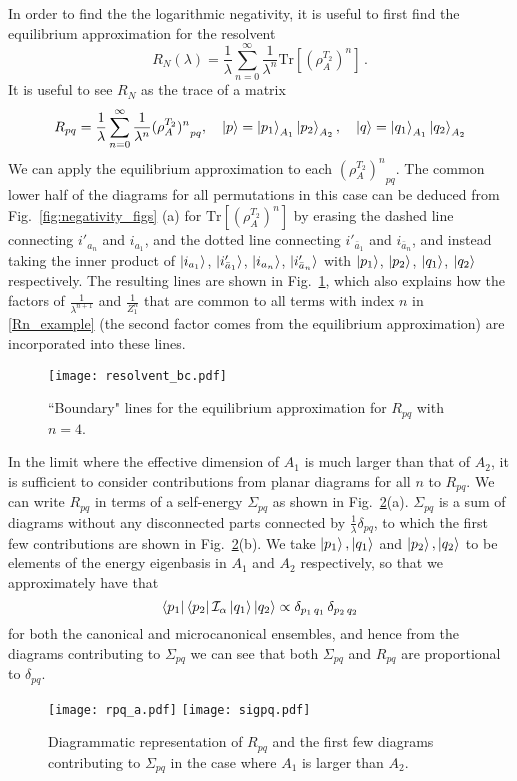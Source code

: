 \documentclass[a4paper,11pt]{article}
\newcommand{\be}{\begin{equation}}
\newcommand{\ee}{\end{equation}}
\newcommand\al{{\alpha}}
\newcommand\sI{{\ensuremath{{\mathcal I}}}}
\begin{document}
\begin{enumerate}
\begin{appendix}
In order to find the the logarithmic negativity, it is useful to first find the equilibrium approximation for the resolvent 
\be 
R_N(\lambda) = \frac{1}{\lambda}\sum_{n=0}^{\infty} \frac{1}{\lambda^n} \text{Tr}[(\rho_A^{T_2})^n]\, . \label{Rn_example}
\ee
It is useful to see $R_N$ as the trace of a matrix 
\be 
R_{pq} = \frac{1}{\lambda}\sum_{n=0}^{\infty} \frac{1}{\lambda^n} {(\rho_A^{T_2})^n}_{pq} , \quad \ket{p} = \ket{p_1}_{A_1} \ket{p_2}_{A_2} , \quad \ket{q} = \ket{q_1}_{A_1} \ket{q_2}_{A_2} 
\ee
We can apply the equilibrium approximation to each ${(\rho_A^{T_2})^n}_{pq}$. The common lower half of the diagrams for all permutations in this case can be deduced from Fig.~\ref{fig:negativity_figs} (a) for $\text{Tr}[(\rho_A^{T_2})^n]$ by erasing the dashed line connecting $i'_{a_{n}}$ and $i_{a_1}$, and the dotted line connecting $i'_{\bar{a}_{1}}$ and $i_{\bar{a}_n}$, and instead taking the inner product of $\ket{i_{a_1}}$, $\ket{i'_{\bar{a}_{1}}}$, $\ket{i_{a_n}}$, $\ket{i'_{\bar{a}_{n}}}$ with $\ket{p_1}$, $\ket{p_2}$, $\ket{q_1}$, $\ket{q_2}$ respectively. The resulting lines are shown in Fig.~\ref{fig:rij_ext}, which also explains how the factors of $\frac{1}{\lambda^{n+1}}$ and $\frac{1}{Z_1^n}$ that are common to all terms with index $n$ in \eqref{Rn_example} (the second factor comes from the equilibrium approximation) are incorporated into these lines. 
\begin{figure}[] 
\centering
\texttt{[image: resolvent\_bc.pdf]}
\caption{``Boundary" lines for the equilibrium approximation for $R_{pq}$ with $n=4$.}
\label{fig:rij_ext}
\end{figure}
In the limit where the effective dimension of $A_1$ is much larger than that of $A_2$, it is sufficient to consider contributions from planar diagrams for all $n$ to $R_{pq}$. We can write $R_{pq}$ in terms of a self-energy $\Sigma_{pq}$ as shown in Fig.~\ref{fig:rpq}(a). $\Sigma_{pq}$ is a sum of diagrams without any disconnected parts connected by $\frac{1}{\lambda}\delta_{pq}$, to which the first few contributions are shown in Fig.~\ref{fig:rpq}(b). We take $\ket{p_1}, \ket{q_1}$ and $\ket{p_2}, \ket{q_2}$ to be elements of the energy eigenbasis in $A_1$ and $A_2$ respectively, so that we approximately have that 
\be 
 \bra{p_1}\bra{p_2}\sI_{\al} \ket{q_1} \ket{q_2} \propto \delta_{p_1 \, q_1}\, \delta_{p_2 \, q_2}
\ee
for both the canonical and microcanonical ensembles, and hence from the diagrams contributing to $\Sigma_{pq}$ we can see that both $\Sigma_{pq}$ and $R_{pq}$ are proportional to $\delta_{pq}$. 
\begin{figure}[] 
\centering
\texttt{[image: rpq\_a.pdf]}
\texttt{[image: sigpq.pdf]}
\caption{Diagrammatic representation of $R_{pq}$ and the first few diagrams contributing to $\Sigma_{pq}$ in the case where $A_1$ is larger than $A_2$. }
\label{fig:rpq}
\end{figure}


\end{appendix}
\end{enumerate}
\end{document}
